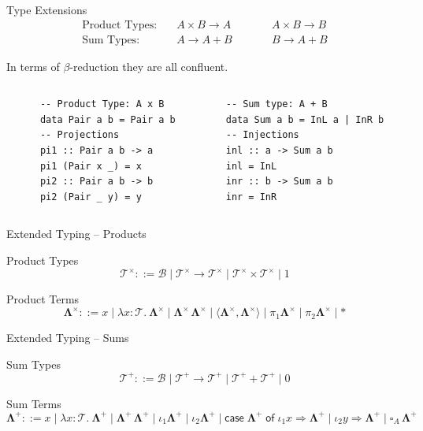 \documentclass[aspectratio=169]{beamer}
\newcommand{\La}{\mathbf{\Lambda}}
\newcommand{\Bset}{\mathcal{B}}
\newcommand{\Tset}{\mathcal{T}}
\begin{document}
\begin{frame}[fragile]{Type Extensions}
  \[
    \begin{aligned}
      \text{Product Types:} \quad & A \times B \to A &\qquad& A \times B \to B \\
      \text{Sum Types:}     \quad & A \to A + B &\qquad& B \to A + B
    \end{aligned}
  \]

  In terms of $\beta$-reduction they are all confluent.

  \begin{columns}[t]
    \begin{verbatim}
      -- Product Type: A x B
      data Pair a b = Pair a b
      -- Projections
      pi1 :: Pair a b -> a
      pi1 (Pair x _) = x
      pi2 :: Pair a b -> b
      pi2 (Pair _ y) = y
    \end{verbatim}
    \begin{verbatim}
      -- Sum type: A + B
      data Sum a b = InL a | InR b
      -- Injections
      inl :: a -> Sum a b
      inl = InL
      inr :: b -> Sum a b
      inr = InR
    \end{verbatim}
  \end{columns}
\end{frame}


\begin{frame}{Extended Typing -- Products}
  \begin{block}{Product Types}
    \[
      \Tset^\times ::= \Bset \mid \Tset^\times \to \Tset^\times \mid \Tset^\times \times \Tset^\times \mid 1
    \]
  \end{block}
  \begin{block}{Product Terms}
    \[
      \La^\times ::= x \mid \lambda x : \Tset.\ \La^\times \mid \La^\times \, \La^\times \mid \langle \La^\times, \La^\times \rangle \mid \pi_1 \La^\times \mid \pi_2 \La^\times \mid *
    \]
  \end{block}
\end{frame}

\begin{frame}{Extended Typing -- Sums}
  \begin{block}{Sum Types}
    \[
      \Tset^+ ::= \Bset \mid \Tset^+ \to \Tset^+ \mid \Tset^+ + \Tset^+ \mid 0
    \]
  \end{block}
  \begin{block}{Sum Terms}
    \[
      \La^+ ::= x 
      \mid \lambda x : \Tset.\ \La^+ 
      \mid \La^+\,\La^+ 
      \mid \iota_1 \La^+ 
      \mid \iota_2 \La^+ 
      \mid \mathsf{case}\; \La^+\; \mathsf{of}\;\iota_1 x \Rightarrow \La^+ \mid \iota_2 y \Rightarrow \La^+
      \mid \square_A\,\La^+
    \]
  \end{block}
\end{frame}
\end{document}
